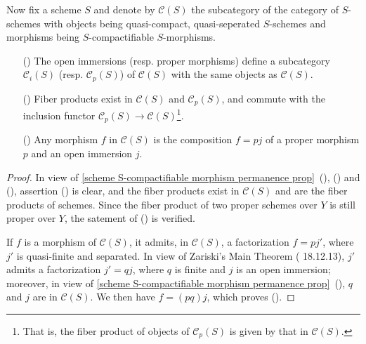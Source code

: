Now fix a scheme $S$ and denote by $\mathcal{C}(S)$ the subcategory of the category of $S$-schemes with objects being quasi-compact, quasi-seperated $S$-schemes and morphisms being $S$-compactifiable $S$-morphisms.

\begin{proposition}\label{scheme S-compactifiable morphism decomposition by open immersion}
\begin{enumerate}
    \item[(\rmnum{1})] The open immersions (resp. proper morphisms) define a subcategory $\mathcal{C}_i(S)$ (resp. $\mathcal{C}_p(S)$) of $\mathcal{C}(S)$ with the same objects as $\mathcal{C}(S)$.
    \item[(\rmnum{2})] Fiber products exist in $\mathcal{C}(S)$ and $\mathcal{C}_p(S)$, and commute with the inclusion functor $\mathcal{C}_p(S)\to\mathcal{C}(S)$\footnote{That is, the fiber product of objects of $\mathcal{C}_p(S)$ is given by that in $\mathcal{C}(S)$.}.
    \item[(\rmnum{3})] Any morphism $f$ in $\mathcal{C}(S)$ is the composition $f=pj$ of a proper morphism $p$ and an open immersion $j$.
\end{enumerate}
\end{proposition}
\begin{proof}
In view of \cref{scheme S-compactifiable morphism permanence prop}~(), () and (), assertion () is clear, and the fiber products exist in $\mathcal{C}(S)$ and are the fiber products of schemes. Since the fiber product of two proper schemes over $Y$ is still proper over $Y$, the satement of () is verified.\par
If $f$ is a morphism of $\mathcal{C}(S)$, it admits, in $\mathcal{C}(S)$, a factorization $f=pj'$, where $j'$ is quasi-finite and separated. In view of Zariski's Main Theorem (\cite{EGA4-4} 18.12.13), $j'$ admits a factorization $j'=qj$, where $q$ is finite and $j$ is an open immersion; moreover, in view of \cref{scheme S-compactifiable morphism permanence prop}~(), $q$ and $j$ are in $\mathcal{C}(S)$. We then have $f=(pq)j$, which proves (). 
\end{proof}

